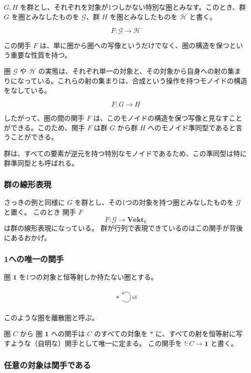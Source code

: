 \documentclass[uplatex,a4j,12pt,dvipdfmx]{jsarticle}
\begin{document}
$G, H$ を群とし、それぞれを対象が1つしかない特別な圏とみなす。このとき、群 $G$ を圏とみなしたものを $\mathcal{G}$、群 $H$ を圏とみなしたものを $\mathcal{H}$ と書く。

$$F: \mathcal{G} \to \mathcal{H}$$

この関手 $F$ は、単に圏から圏への写像というだけでなく、圏の構造を保つという重要な性質を持つ。

圏 $\mathcal{G}$ や $\mathcal{H}$ の実態は、それぞれ単一の対象と、その対象から自身への射の集まりになっている。これらの射の集まりは、合成という操作を持つモノイドの構造をなしている。

$$F: G \to H$$

したがって、圏の間の関手 $F$ は、このモノイドの構造を保つ写像と見なすことができる。このため、関手 $F$ は群 $G$ から群 $H$ へのモノイド準同型であると言うことができる。

群は、すべての要素が逆元を持つ特別なモノイドであるため、この準同型は特に群準同型とも呼ばれる。




\subsubsection{群の線形表現}

さっきの例と同様に
$G$ を群とし、その1つの対象を持つ圏とみなしたものを $\mathcal{G}$ と置く。
このとき
関手 $F$
$$F : \mathcal{G} \to \mathbf{Vekt}_{k} $$
は群の線形表現になっている。
群が行列で表現できているのはこの関手が背後にあるおかげ。


\subsubsection{1への唯一の関手}

圏 $\textbf{1}$ を1つの対象と恒等射しか持たない圏とする。
\[
	\begin{tikzcd}
		* \arrow["{\rm id}"', loop, distance=2em, in=35, out=325]
	\end{tikzcd}
\]
このような圏を離散圏と呼ぶ。

圏 $C$ から 圏 $\textbf{1}$ への関手は
$C$ のすべての対象を $*$ に、すべての射を恒等射に写すような（自明な）関手として唯一に定まる。
この関手を $!: C \to \mathbf{1}$ と書く。


\subsubsection{任意の対象は関手である}
\end{document}
